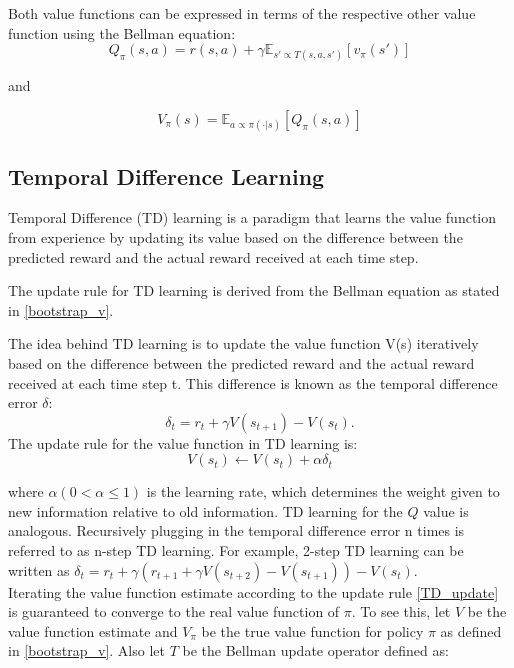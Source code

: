 Both value functions can be expressed in terms of the respective other value function using the Bellman equation:
\begin{equation}
    \label{q_from_v}
    Q_{\pi}(s,a) = r(s,a) + \gamma \mathbb{E}_{s'\propto T(s,a,s')}\left[ v_{\pi}(s') \right]
\end{equation}

and 

\begin{equation}
    V_{\pi}(s) = \mathbb{E}_{a \propto \pi(\cdot|s)} \left[ Q_\pi(s,a) \right]
\end{equation}



\subsection{Temporal Difference Learning}
\label{subsection:TD_learning}
Temporal Difference (TD) learning is a paradigm that learns the value function from experience by updating its value based on the difference between the predicted reward and the actual reward received at each time step.

The update rule for TD learning is derived from the Bellman equation as stated in \ref{bootstrap_v}.

The idea behind TD learning is to update the value function V(s) iteratively based on the difference between the predicted reward and the actual reward received at each time step t. This difference is known as the temporal difference error $\delta$:
\begin{equation}
    \label{TD_update}
    \delta_t = r_t + \gamma V(s_{t+1}) - V(s_t).
\end{equation}
The update rule for the value function in TD learning is:
$$V(s_t) \leftarrow V(s_t) + \alpha \delta_t$$

where $\alpha (0 < \alpha \leq 1)$ is the learning rate, which determines the weight given to new information relative to old information. TD learning for the $Q$ 
value is analogous. Recursively plugging in the temporal difference error n times is referred to as n-step TD learning. For example, 2-step TD learning can be written as 
$\delta_t = r_t + \gamma (r_{t+1} + \gamma V(s_{t+2}) - V(s_{t+1})  ) - V(s_t)$.\\

Iterating the value function estimate according to the update rule \ref{TD_update} is guaranteed to converge to the real value function of $\pi$. To see this, 
let $V$ be the value function estimate and $V_{\pi}$ be the true value function for policy $\pi$ as defined in \ref{bootstrap_v}. Also let $T$ be the 
Bellman update operator defined as:

